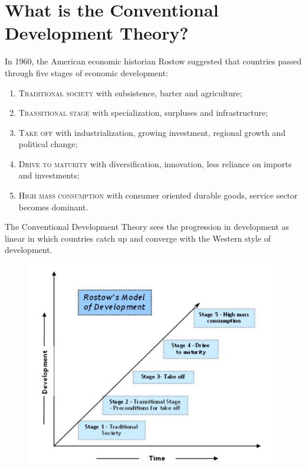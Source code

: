 \section{What is the Conventional Development Theory?}
In 1960, the American economic historian Rostow suggested that countries passed through five stages of economic development:
\begin{enumerate}
\item \textsc{Traditional society} with subsistence, barter and agriculture;
\item \textsc{Transitional stage} with specialization, surpluses and infrastructure;
\item \textsc{Take off} with industrialization, growing investment, regional growth and political change;
\item \textsc{Drive to maturity} with diversification, innovation, less reliance on imports and investments;
\item \textsc{High mass consumption} with consumer oriented durable goods, service sector becomes dominant. 
\end{enumerate}
The Conventional Development Theory sees the progression in development as linear in which countries catch up and converge with the Western style of development. 

\begin{figure}[ht]
\begin{center}
\includegraphics[scale=0.9]{Rostow}
\end{center}
\end{figure}


